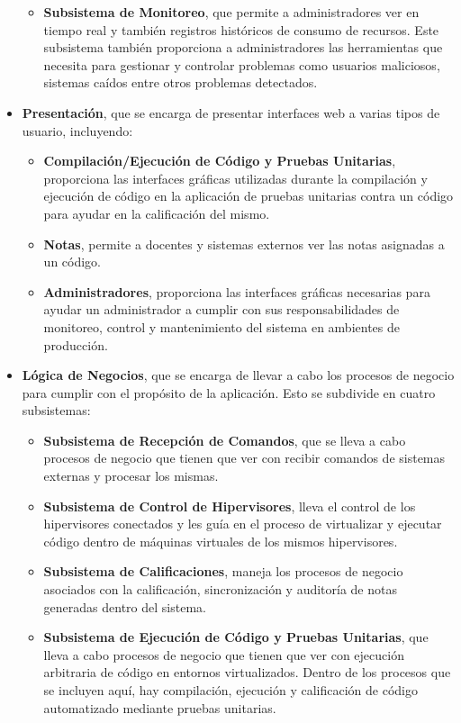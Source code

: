 \begin{itemize}
\begin{itemize}
    	\item \textbf{Subsistema de Monitoreo}, que permite a administradores ver en tiempo real y también registros históricos de consumo de recursos. Este subsistema también proporciona a administradores las herramientas que necesita para gestionar y controlar problemas como usuarios maliciosos, sistemas caídos entre otros problemas detectados.
    \end{itemize}
	\item \textbf{Presentación}, que se encarga de presentar interfaces web a varias tipos de usuario, incluyendo:
    \begin{itemize}
    	\item \textbf{Compilación/Ejecución de Código y Pruebas Unitarias}, proporciona las interfaces gráficas utilizadas durante la compilación y ejecución de código en la aplicación de pruebas unitarias contra un código para ayudar en la calificación del mismo.
        \item \textbf{Notas}, permite a docentes y sistemas externos ver las notas asignadas a un código.
        \item \textbf{Administradores}, proporciona las interfaces gráficas necesarias para ayudar un administrador a cumplir con sus responsabilidades de monitoreo, control y mantenimiento del sistema en ambientes de producción.
    \end{itemize}
	\item \textbf{Lógica de Negocios}, que se encarga de llevar a cabo los procesos de negocio para cumplir con el propósito de la aplicación. Esto se subdivide en cuatro subsistemas:
    \begin{itemize}
    	\item \textbf{Subsistema de Recepción de Comandos}, que se lleva a cabo procesos de negocio que tienen que ver con recibir comandos de sistemas externas y procesar los mismas.
        \item \textbf{Subsistema de Control de Hipervisores}, lleva el control de los hipervisores conectados y les guía en el proceso de virtualizar y ejecutar código dentro de máquinas virtuales de los mismos hipervisores.
        \item \textbf{Subsistema de Calificaciones}, maneja los procesos de negocio asociados con la calificación, sincronización y auditoría de notas generadas dentro del sistema.
        \item \textbf{Subsistema de Ejecución de Código y Pruebas Unitarias}, que lleva a cabo procesos de negocio que tienen que ver con ejecución arbitraria de código en entornos virtualizados. Dentro de los procesos que se incluyen aquí, hay compilación, ejecución y calificación de código automatizado mediante pruebas unitarias.

\end{itemize}
\end{itemize}
